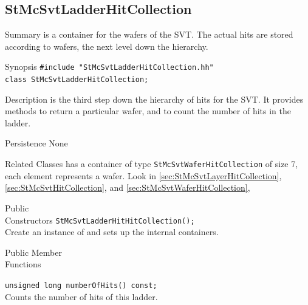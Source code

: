 \subsection{StMcSvtLadderHitCollection}
 
\label{sec:StMcSvtLadderHitCollection}
\begin{Entry}
\item[Summary]
     is a container for the
    wafers of the SVT.  The actual hits are stored according to
    wafers, the next level down the hierarchy.

\item[Synopsis]
    \verb+#include "StMcSvtLadderHitCollection.hh"+\\
    \verb+class StMcSvtLadderHitCollection;+\\

\item[Description]
     is the third step down
    the hierarchy of hits for the SVT.  It provides
    methods to return a particular wafer, and to
    count the number of hits in the ladder.

\item[Persistence]
    None

\item[Related Classes]
    has a container of type {\tt StMcSvtWaferHitCollection}
    of size 7, each element represents a wafer.  Look in
     \ref{sec:StMcSvtLayerHitCollection},
     \ref{sec:StMcSvtHitCollection},
    and  \ref{sec:StMcSvtWaferHitCollection},

\item[Public\\ Constructors]
    \verb+StMcSvtLadderHitHitCollection();+\\
    Create an instance of 
    and sets up the internal containers.

\item[Public Member\\ Functions]

    \verb+unsigned long numberOfHits() const;+\\
    Counts the number of hits of this ladder.


\end{Entry}
